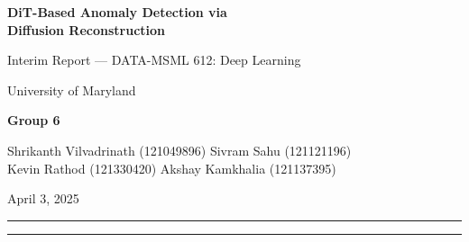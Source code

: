 \documentclass[11pt,letterpaper]{article}
\newcommand{\auroc}{\textsc{AUROC}}
\begin{document}
\begin{titlepage}
\centering
\vspace*{2cm}
{\LARGE\bfseries DiT-Based Anomaly Detection via\\[6pt] Diffusion Reconstruction\par}
\vspace{1cm}
{\large Interim Report --- DATA-MSML 612: Deep Learning\par}
\vspace{0.5cm}
{\large University of Maryland\par}
\vspace{1.5cm}
{\large\bfseries Group 6\par}
\vspace{0.5cm}
{\large
Shrikanth Vilvadrinath (121049896) \quad Sivram Sahu (121121196)\\[4pt]
Kevin Rathod (121330420) \quad Akshay Kamkhalia (121137395)\par}
\vspace{1.5cm}
{\large April 3, 2025\par}
\vspace{2cm}
\hrule
\vspace{0.5cm}
\begin{abstract}
\noindent
We present an interim report on applying Diffusion Transformers (DiT) to unsupervised
industrial anomaly detection on the MVTec Anomaly Detection benchmark~\cite{mvtec2019}.
Our approach trains a lightweight DiT-Tiny model (4.4M parameters) exclusively on normal
images and detects anomalies through reconstruction error at test time.
We train and evaluate across all 15 MVTec categories, achieving a mean image-level
\auroc{} of \textbf{0.573} and pixel-level \auroc{} of \textbf{0.759} using L2 reconstruction
scoring. A key finding is that the pixel scoring method has a dominant effect: switching from
SSIM to L2 scoring on the same checkpoint improves image \auroc{} from 0.305 to 0.744 on
hazelnut --- a near 2.4$\times$ improvement with no retraining. We compare against PatchCore
\cite{patchcore2022} (0.858 image \auroc{}) and two classical baselines, and conduct
ablation studies on noise timestep, scoring method, backbone architecture, and feature
combination. Concrete improvements planned for the final report include higher resolution
training (256$\times$256), a larger DiT variant, and pretrained backbone initialization.
\end{abstract}
\vspace{0.3cm}
\hrule
\end{titlepage}
\end{document}
